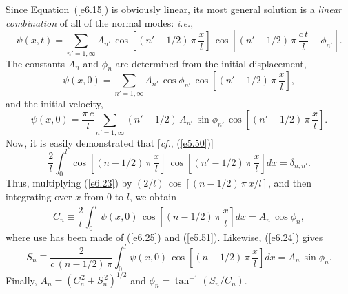Since Equation~(\ref{e6.15}) is obviously linear, its most general solution
is a {\em linear combination}\/ of all of the normal modes: {\em i.e.}, 
\begin{equation}
\psi(x,t) = \sum_{n'=1,\infty} A_{n'}\,\cos\left[(n'-1/2)\,\pi\,\frac{x}{l}\right]\,\cos\left[(n'-1/2)\,\pi\,\frac{c\,t}{l}-\phi_{n'}\right].
\end{equation}
The constants $A_n$ and $\phi_n$ are determined from the initial
displacement,
\begin{equation}\label{e6.23}
\psi(x,0) = \sum_{n'=1,\infty} A_{n'}\,\cos \phi_{n'}\,\cos\left[(n'-1/2)\,\pi\,\frac{x}{l}\right],
\end{equation}
and the initial velocity,
\begin{equation}\label{e6.24}
\dot{\psi}(x,0) = \frac{\pi\,c}{l}\sum_{n'=1,\infty} (n'-1/2)\,A_{n'}\,\sin \phi_{n'}\,\cos\left[(n'-1/2)\,\pi\,\frac{x}{l}\right].
\end{equation}
Now, it is easily demonstrated that [{\em cf.}, (\ref{e5.50})]
\begin{equation}\label{e6.25}
\frac{2}{l}\int_0^l \cos\left[(n-1/2)\,\pi\,\frac{x}{l}\right]\,\cos\left[(n'-1/2)\,\pi\,\frac{x}{l}\right]dx = \delta_{n,n'}.
\end{equation}
Thus, multiplying (\ref{e6.23}) by $(2/l)\,\cos[(n-1/2)\,\pi\,x/l]$, and then integrating
over $x$ from $0$ to $l$, we obtain
\begin{equation}
C_n \equiv \frac{2}{l} \int_0^l\psi(x,0)\,\cos\left[(n-1/2)\,\pi\,\frac{x}{l}\right]dx = A_n\,\cos\phi_n,
\end{equation}
where use has been made of (\ref{e6.25}) and (\ref{e5.51}).
Likewise, (\ref{e6.24}) gives
\begin{equation}
S_n \equiv \frac{2}{c\,(n-1/2)\,\pi} \int_0^l\dot{\psi}(x,0)\,\cos\left[(n-1/2)\,\pi\,\frac{x}{l}\right]dx = A_n\,\sin\phi_n.
\end{equation}
Finally, $A_n = (C_n^{\,2}+S_n^{\,2})^{1/2}$ and
$\phi_n=\tan^{-1}(S_n/C_n)$. 

